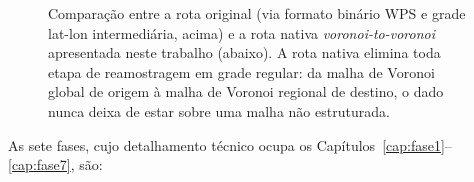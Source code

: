 \begin{figure}[H]
  \caption{Comparação entre a rota original (via formato binário WPS e
    grade lat-lon intermediária, acima) e a rota nativa
    \emph{voronoi-to-voronoi} apresentada neste trabalho (abaixo). A rota
    nativa elimina toda etapa de reamostragem em grade regular: da malha
    de Voronoi global de origem à malha de Voronoi regional de destino,
    o dado nunca deixa de estar sobre uma malha não estruturada.}
  \label{fig:comparacao_rotas}
\end{figure}

As sete fases, cujo detalhamento técnico ocupa os
Capítulos~\ref{cap:fase1}--\ref{cap:fase7}, são:

